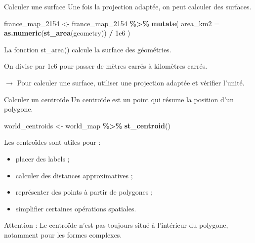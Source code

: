\documentclass[
  10pt,
  ignorenonframetext,
]{beamer}
\newenvironment{Shaded}{\begin{snugshade}}{\end{snugshade}}
\newcommand{\AttributeTok}[1]{\textcolor[rgb]{0.13,0.29,0.53}{#1}}
\newcommand{\FloatTok}[1]{\textcolor[rgb]{0.00,0.00,0.81}{#1}}
\newcommand{\FunctionTok}[1]{\textcolor[rgb]{0.13,0.29,0.53}{\textbf{#1}}}
\newcommand{\NormalTok}[1]{#1}
\newcommand{\OtherTok}[1]{\textcolor[rgb]{0.56,0.35,0.01}{#1}}
\newcommand{\SpecialCharTok}[1]{\textcolor[rgb]{0.81,0.36,0.00}{\textbf{#1}}}
\begin{document}
\begin{frame}[fragile]{Calculer une surface}
\label{calculer-une-surface}
Une fois la projection adaptée, on peut calculer des surfaces.

\begin{Shaded}
\begin{Highlighting}[]
\NormalTok{france\_map\_2154 }\OtherTok{\textless{}{-}}\NormalTok{ france\_map\_2154 }\SpecialCharTok{\%\textgreater{}\%}
  \FunctionTok{mutate}\NormalTok{(}
    \AttributeTok{area\_km2 =} \FunctionTok{as.numeric}\NormalTok{(}\FunctionTok{st\_area}\NormalTok{(geometry)) }\SpecialCharTok{/} \FloatTok{1e6}
\NormalTok{  )}
\end{Highlighting}
\end{Shaded}

La fonction st\_area() calcule la surface des géométries.

On divise par 1e6 pour passer de mètres carrés à kilomètres carrés.

\(\rightarrow\) Pour calculer une surface, utiliser une projection
adaptée et vérifier l'unité.
\end{frame}

\begin{frame}[fragile]{Calculer un centroïde}
\label{calculer-un-centrouxefde}
Un centroïde est un point qui résume la position d'un polygone.

\begin{Shaded}
\begin{Highlighting}[]
\NormalTok{world\_centroids }\OtherTok{\textless{}{-}}\NormalTok{ world\_map }\SpecialCharTok{\%\textgreater{}\%}
  \FunctionTok{st\_centroid}\NormalTok{()}
\end{Highlighting}
\end{Shaded}

Les centroïdes sont utiles pour :

\begin{itemize}
\item placer des labels ;
\item calculer des distances approximatives ;
\item représenter des points à partir de polygones ;
\item simplifier certaines opérations spatiales.
\end{itemize}

Attention : Le centroïde n'est pas toujours situé à l'intérieur du
polygone, notamment pour les formes complexes.
\end{frame}
\end{document}
